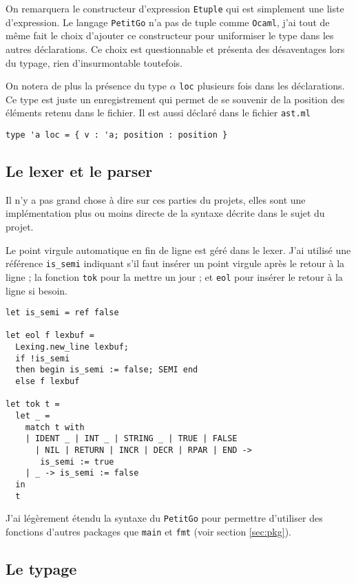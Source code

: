 \documentclass{article}
\begin{document}
On remarquera le constructeur d'expression \texttt{Etuple} qui est simplement une liste d'expression. Le langage \texttt{PetitGo} n'a pas de tuple comme \texttt{Ocaml}, j'ai tout de même fait le choix d'ajouter ce constructeur pour uniformiser le type dans les autres déclarations. Ce choix est questionnable et présenta des désaventages lors du typage, rien d'insurmontable toutefois.

On notera de plus la présence du type $\alpha$ \texttt{loc} plusieurs fois dans les déclarations. Ce type est juste un enregistrement qui permet de se souvenir de la position des éléments retenu dans le fichier. Il est aussi déclaré dans le fichier \texttt{ast.ml}

\begin{verbatim}
type 'a loc = { v : 'a; position : position }
\end{verbatim}

\subsection{Le lexer et le parser}

Il n'y a pas grand chose à dire sur ces parties du projets, elles sont une implémentation plus ou moins directe de la syntaxe décrite dans le sujet du projet.

Le point virgule automatique en fin de ligne est géré dans le lexer. J'ai utilisé une référence \texttt{is\_semi} indiquant s'il faut insérer un point virgule après le retour à la ligne ; la fonction \texttt{tok} pour la mettre un jour ; et \texttt{eol} pour insérer le retour à la ligne si besoin.

\begin{verbatim}
let is_semi = ref false

let eol f lexbuf =
  Lexing.new_line lexbuf;
  if !is_semi
  then begin is_semi := false; SEMI end
  else f lexbuf

let tok t =
  let _ =
    match t with
    | IDENT _ | INT _ | STRING _ | TRUE | FALSE
      | NIL | RETURN | INCR | DECR | RPAR | END ->
       is_semi := true
    | _ -> is_semi := false
  in
  t

\end{verbatim}

J'ai légèrement étendu la syntaxe du \texttt{PetitGo} pour permettre d'utiliser des fonctions d'autres packages que \texttt{main} et \texttt{fmt} (voir section \ref{sec:pkg}).

\subsection{Le typage}
\end{document}
